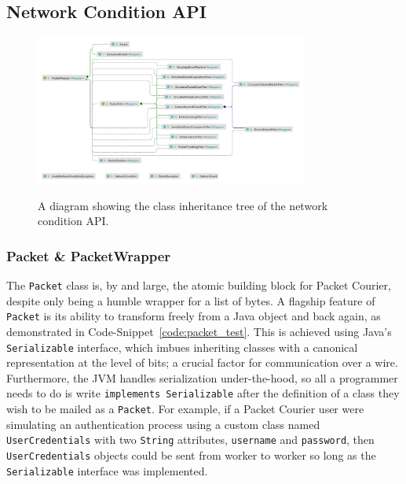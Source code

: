 \newpage

\subsection{Network Condition API}\label{subsection:network_condition_api}

\begin{figure}[!h]
    \includegraphics[width=0.8\textwidth]{images/chapter_4_implementation/network_condition_api_tree}
    \centering~\caption{A diagram showing the class inheritance tree of the network condition API.}
    \label{fig:chapter_4_implementation-network_condition_api_tree}
\end{figure}

\subsubsection{Packet \& PacketWrapper}\label{subsubsection:packet_and_packet_wrapper}

The \texttt{Packet} class is, by and large, the atomic building block for Packet Courier, despite only being a humble
wrapper for a list of bytes. A flagship feature of \texttt{Packet} is its ability to transform freely from a Java
object and back again, as demonstrated in Code-Snippet~\ref{code:packet_test}. This is achieved using Java's
\texttt{Serializable} interface\cite{java_Serializable}, which imbues inheriting classes with a canonical
representation at the level of bits; a crucial factor for communication over a wire. Furthermore, the JVM handles
serialization under-the-hood, so all a programmer needs to do is write \texttt{implements Serializable} after the
definition of a class they wish to be mailed as a \texttt{Packet}. For example, if a Packet Courier user were
simulating an authentication process using a custom class named \texttt{UserCredentials} with two \texttt{String}
attributes, \texttt{username} and \texttt{password}, then \texttt{UserCredentials} objects could be sent from worker
to worker so long as the \texttt{Serializable} interface was implemented.

